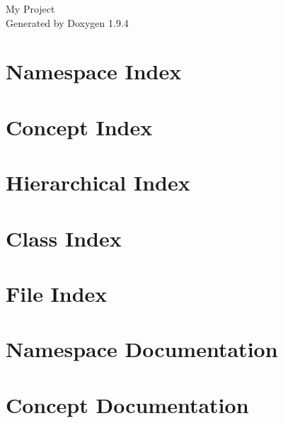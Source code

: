 \documentclass[twoside]{book}
\newcommand{\+}{\discretionary{\mbox{\scriptsize$\hookleftarrow$}}{}{}}
\newcommand{\clearemptydoublepage}{%
    \newpage{\pagestyle{empty}\cleardoublepage}%
  }
\begin{document}
  \raggedbottom
    \hypersetup{pageanchor=false,
                bookmarksnumbered=true,
                pdfencoding=unicode
               }
  \begin{titlepage}
  \vspace*{7cm}
  \begin{center}%
  {\Large My Project}\\
  \vspace*{1cm}
  {\large Generated by Doxygen 1.9.4}\\
  \end{center}
  \end{titlepage}
  \clearemptydoublepage
  \tableofcontents
  \clearemptydoublepage
  \hypersetup{pageanchor=true}
\chapter{Namespace Index}

\chapter{Concept Index}

\chapter{Hierarchical Index}

\chapter{Class Index}

\chapter{File Index}

\chapter{Namespace Documentation}






\chapter{Concept Documentation}

\end{document}
